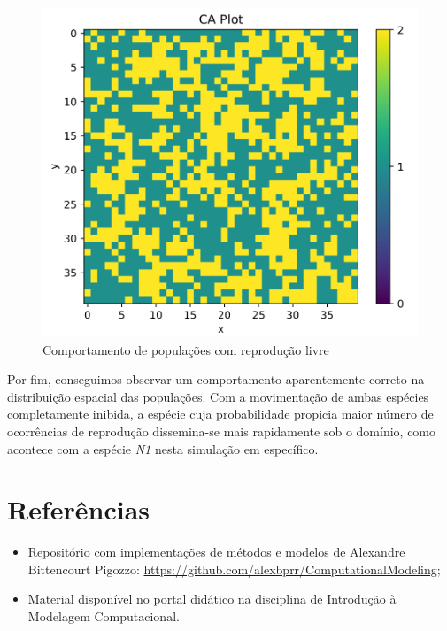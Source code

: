 \documentclass[a4paper, 12pt]{article}
\begin{document}
\begin{figure}[H]
    \includegraphics[width=.49\textwidth]{Images/Exercise 7/rep/9.png}
    \caption{Comportamento de populações com reprodução livre}
    \label{fig:map7}
\end{figure}

\pagebreak

Por fim, conseguimos observar um comportamento aparentemente correto na distribuição espacial das populações. Com a movimentação de ambas espécies completamente inibida, a espécie cuja probabilidade propicia maior número de ocorrências de reprodução dissemina-se mais rapidamente sob o domínio, como acontece com a espécie \emph{N1} nesta simulação em específico.

\section*{Referências}

\begin{itemize}
    \item Repositório com implementações de métodos e modelos de Alexandre Bittencourt Pigozzo: \url{https://github.com/alexbprr/ComputationalModeling};
    \item Material disponível no portal didático na disciplina de Introdução à Modelagem Computacional.
\end{itemize}
\end{document}
